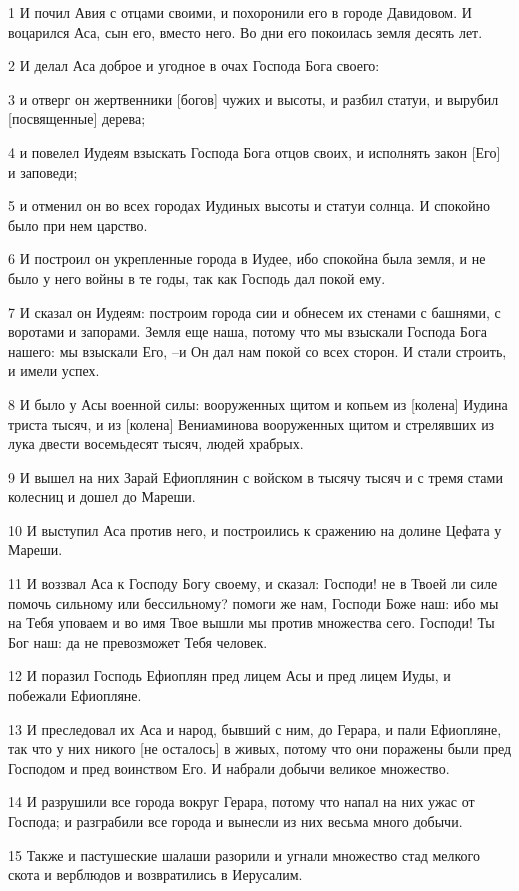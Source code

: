 \par 1 И почил Авия с отцами своими, и похоронили его в городе Давидовом. И воцарился Аса, сын его, вместо него. Во дни его покоилась земля десять лет.
\par 2 И делал Аса доброе и угодное в очах Господа Бога своего:
\par 3 и отверг он жертвенники [богов] чужих и высоты, и разбил статуи, и вырубил [посвященные] дерева;
\par 4 и повелел Иудеям взыскать Господа Бога отцов своих, и исполнять закон [Его] и заповеди;
\par 5 и отменил он во всех городах Иудиных высоты и статуи солнца. И спокойно было при нем царство.
\par 6 И построил он укрепленные города в Иудее, ибо спокойна была земля, и не было у него войны в те годы, так как Господь дал покой ему.
\par 7 И сказал он Иудеям: построим города сии и обнесем их стенами с башнями, с воротами и запорами. Земля еще наша, потому что мы взыскали Господа Бога нашего: мы взыскали Его, --и Он дал нам покой со всех сторон. И стали строить, и имели успех.
\par 8 И было у Асы военной силы: вооруженных щитом и копьем из [колена] Иудина триста тысяч, и из [колена] Вениаминова вооруженных щитом и стрелявших из лука двести восемьдесят тысяч, людей храбрых.
\par 9 И вышел на них Зарай Ефиоплянин с войском в тысячу тысяч и с тремя стами колесниц и дошел до Мареши.
\par 10 И выступил Аса против него, и построились к сражению на долине Цефата у Мареши.
\par 11 И воззвал Аса к Господу Богу своему, и сказал: Господи! не в Твоей ли силе помочь сильному или бессильному? помоги же нам, Господи Боже наш: ибо мы на Тебя уповаем и во имя Твое вышли мы против множества сего. Господи! Ты Бог наш: да не превозможет Тебя человек.
\par 12 И поразил Господь Ефиоплян пред лицем Асы и пред лицем Иуды, и побежали Ефиопляне.
\par 13 И преследовал их Аса и народ, бывший с ним, до Герара, и пали Ефиопляне, так что у них никого [не осталось] в живых, потому что они поражены были пред Господом и пред воинством Его. И набрали добычи великое множество.
\par 14 И разрушили все города вокруг Герара, потому что напал на них ужас от Господа; и разграбили все города и вынесли из них весьма много добычи.
\par 15 Также и пастушеские шалаши разорили и угнали множество стад мелкого скота и верблюдов и возвратились в Иерусалим.

